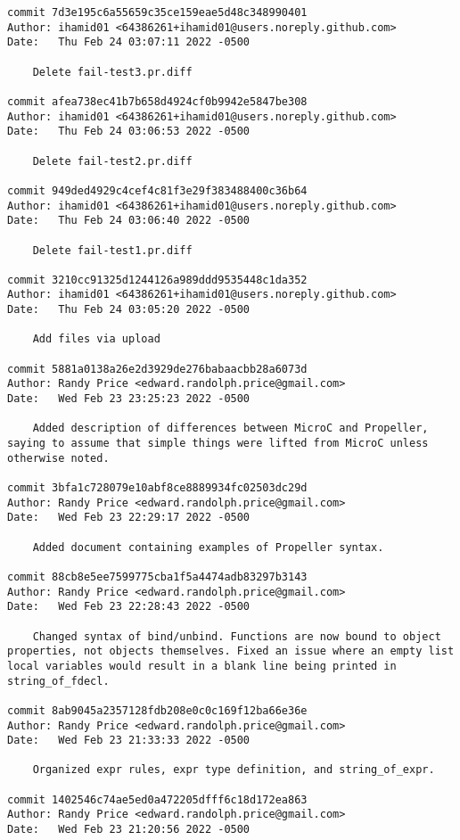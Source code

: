 {\begin{verbatim}
commit 7d3e195c6a55659c35ce159eae5d48c348990401
Author: ihamid01 <64386261+ihamid01@users.noreply.github.com>
Date:   Thu Feb 24 03:07:11 2022 -0500

    Delete fail-test3.pr.diff

commit afea738ec41b7b658d4924cf0b9942e5847be308
Author: ihamid01 <64386261+ihamid01@users.noreply.github.com>
Date:   Thu Feb 24 03:06:53 2022 -0500

    Delete fail-test2.pr.diff

commit 949ded4929c4cef4c81f3e29f383488400c36b64
Author: ihamid01 <64386261+ihamid01@users.noreply.github.com>
Date:   Thu Feb 24 03:06:40 2022 -0500

    Delete fail-test1.pr.diff

commit 3210cc91325d1244126a989ddd9535448c1da352
Author: ihamid01 <64386261+ihamid01@users.noreply.github.com>
Date:   Thu Feb 24 03:05:20 2022 -0500

    Add files via upload

commit 5881a0138a26e2d3929de276babaacbb28a6073d
Author: Randy Price <edward.randolph.price@gmail.com>
Date:   Wed Feb 23 23:25:23 2022 -0500

    Added description of differences between MicroC and Propeller, saying to assume that simple things were lifted from MicroC unless otherwise noted.

commit 3bfa1c728079e10abf8ce8889934fc02503dc29d
Author: Randy Price <edward.randolph.price@gmail.com>
Date:   Wed Feb 23 22:29:17 2022 -0500

    Added document containing examples of Propeller syntax.

commit 88cb8e5ee7599775cba1f5a4474adb83297b3143
Author: Randy Price <edward.randolph.price@gmail.com>
Date:   Wed Feb 23 22:28:43 2022 -0500

    Changed syntax of bind/unbind. Functions are now bound to object properties, not objects themselves. Fixed an issue where an empty list local variables would result in a blank line being printed in string_of_fdecl.

commit 8ab9045a2357128fdb208e0c0c169f12ba66e36e
Author: Randy Price <edward.randolph.price@gmail.com>
Date:   Wed Feb 23 21:33:33 2022 -0500

    Organized expr rules, expr type definition, and string_of_expr.

commit 1402546c74ae5ed0a472205dfff6c18d172ea863
Author: Randy Price <edward.randolph.price@gmail.com>
Date:   Wed Feb 23 21:20:56 2022 -0500


\end{verbatim}}
